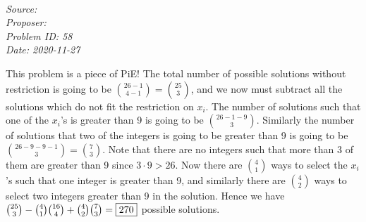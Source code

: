 \SSbreak\\
\emph{Source: \Cfolk}\\
\emph{Proposer: \Pss}\\
\emph{Problem ID: 58}\\
\emph{Date: 2020-11-27}\\
\SSbreak

\bigskip

\begin{solution}\hfil\medskip

    This problem is a piece of PiE! The total number of possible solutions without restriction is going to be \(\binom{26-1}{4-1}=\binom{25}{3}\), and we now must subtract all the solutions which do not fit the restriction on \(x_i\). 
    The number of solutions such that one of the \(x_i\)'s is greater than 9 is going to be \(\binom{26-1-9}{3}\). 
    Similarly the number of solutions that two of the integers is going to be greater than 9 is going to be \(\binom{26-9-9-1}{3}=\binom{7}{3}\). 
    Note that there are no integers such that more than 3 of them are greater than 9 since \(3\cdot9>26\). 
    Now there are \(\binom{4}{1}\) ways to select the \(x_i\)'s such that one integer is greater than 9, and similarly there are \(\binom{4}{2}\) ways to select two integers greater than 9 in the solution. Hence we have \(\binom{25}{3}-\binom{4}{1}\binom{16}{4}+\binom{4}{2}\binom{7}{3}=\fbox{270}\) possible solutions.
\end{solution}